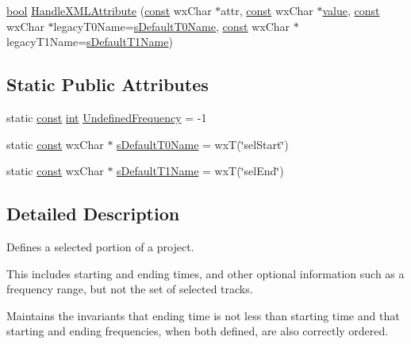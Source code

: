 \begin{DoxyCompactItemize}
\item 
\hyperlink{mac_2config_2i386_2lib-src_2libsoxr_2soxr-config_8h_abb452686968e48b67397da5f97445f5b}{bool} \hyperlink{class_selected_region_a5f7c4ad178464ca648d50e8607e41226}{Handle\+X\+M\+L\+Attribute} (\hyperlink{getopt1_8c_a2c212835823e3c54a8ab6d95c652660e}{const} wx\+Char $\ast$attr, \hyperlink{getopt1_8c_a2c212835823e3c54a8ab6d95c652660e}{const} wx\+Char $\ast$\hyperlink{lib_2expat_8h_a4a30a13b813682e68c5b689b45c65971}{value}, \hyperlink{getopt1_8c_a2c212835823e3c54a8ab6d95c652660e}{const} wx\+Char $\ast$legacy\+T0\+Name=\hyperlink{class_selected_region_a0b126622c276f34b78855ecb7f14bd6a}{s\+Default\+T0\+Name}, \hyperlink{getopt1_8c_a2c212835823e3c54a8ab6d95c652660e}{const} wx\+Char $\ast$legacy\+T1\+Name=\hyperlink{class_selected_region_a32ec0f68631275c0abf57eb1deadaf20}{s\+Default\+T1\+Name})
\end{DoxyCompactItemize}
\subsection*{Static Public Attributes}
\begin{DoxyCompactItemize}
\item 
static \hyperlink{getopt1_8c_a2c212835823e3c54a8ab6d95c652660e}{const} \hyperlink{xmltok_8h_a5a0d4a5641ce434f1d23533f2b2e6653}{int} \hyperlink{class_selected_region_aeb44ed227fd0a3396dc40f57efe3d432}{Undefined\+Frequency} = -\/1
\item 
static \hyperlink{getopt1_8c_a2c212835823e3c54a8ab6d95c652660e}{const} wx\+Char $\ast$ \hyperlink{class_selected_region_a0b126622c276f34b78855ecb7f14bd6a}{s\+Default\+T0\+Name} = wxT(\char`\"{}sel\+Start\char`\"{})
\item 
static \hyperlink{getopt1_8c_a2c212835823e3c54a8ab6d95c652660e}{const} wx\+Char $\ast$ \hyperlink{class_selected_region_a32ec0f68631275c0abf57eb1deadaf20}{s\+Default\+T1\+Name} = wxT(\char`\"{}sel\+End\char`\"{})
\end{DoxyCompactItemize}


\subsection{Detailed Description}
Defines a selected portion of a project. 

This includes starting and ending times, and other optional information such as a frequency range, but not the set of selected tracks.

Maintains the invariants that ending time is not less than starting time and that starting and ending frequencies, when both defined, are also correctly ordered. 

